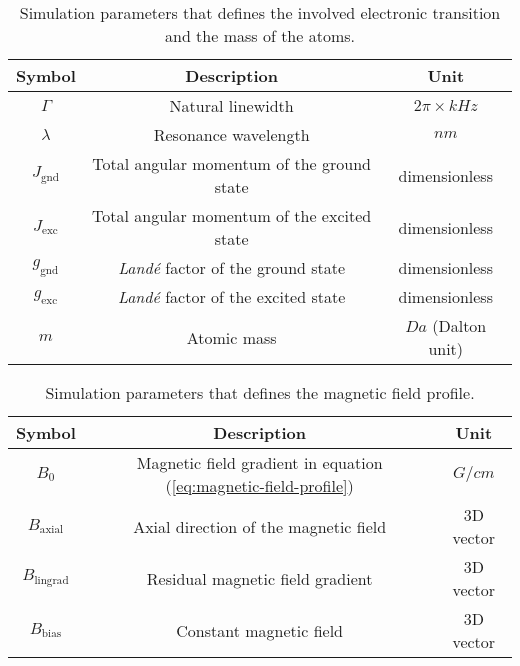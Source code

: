 \begin{table}[!ht]
    \caption{Simulation parameters that defines the involved electronic transition and the mass of the atoms.}
    \begin{tabular}{|c|c|c|}
        \hline
        \textbf{Symbol} & \textbf{Description} & \textbf{Unit} \\ \hline
        $ \Gamma $ & Natural linewidth & $ 2\pi \times kHz $ \\
        $ \lambda $ & Resonance wavelength & $ nm $ \\
        $ J_{\textrm{gnd}} $ & Total angular momentum of the ground state & dimensionless \\
        $ J_{\textrm{exc}} $ & Total angular momentum of the excited state & dimensionless \\
        $ g_{\textrm{gnd}} $ & \textit{Landé} factor of the ground state & dimensionless \\
        $ g_{\textrm{exc}} $ & \textit{Landé} factor of the excited state & dimensionless \\
        $ m $ & Atomic mass & $ Da $ (Dalton unit) \\
        \hline
    \end{tabular}
    \vspace{10px}
    \label{tab:transition-parameters}
\end{table}

\begin{table}[!ht]
    \centering
    \caption{Simulation parameters that defines the magnetic field profile.}
    \begin{tabular}{|c|c|c|}
        \hline
        \textbf{Symbol} & \textbf{Description} & \textbf{Unit} \\ \hline
        $ B_0 $ & Magnetic field gradient in equation (\ref{eq:magnetic-field-profile}) & $ G/cm $ \\
        $ B_{\textrm{axial}} $ & Axial direction of the magnetic field & 3D vector \\
        $ B_{\textrm{lingrad}} $ & Residual magnetic field gradient & 3D vector \\
        $ B_{\textrm{bias}} $ & Constant magnetic field & 3D vector \\
        \hline
    \end{tabular}
    \vspace{10px}
    \label{tab:magnetic-field-profile-parameters}
\end{table}

